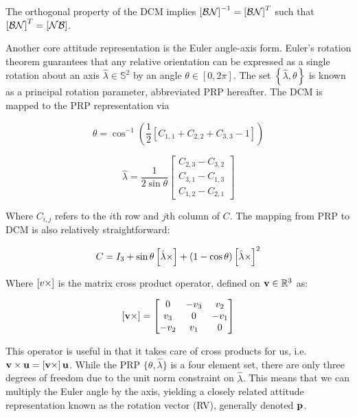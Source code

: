The orthogonal property of the DCM implies $\dcm{bn}^{-1} = \dcm{bn}^T$ such that $\dcm{bn}^T = \dcm{nb}$. 

Another core attitude representation is the Euler angle-axis form. Euler's rotation theorem guarantees that any relative orientation can be expressed as a single rotation about an axis $\hat{\lambda} \in \mathbb{S}^2$ by an angle $\theta \in [0, 2\pi]$. The set $\left\{\hat{\lambda},\theta\right\}$ is known as a principal rotation parameter, abbreviated PRP hereafter. The DCM is mapped to the PRP representation via \cite{shuster1993}

\begin{equation}
    \theta = \cos^{-1}\left(\frac{1}{2} \left[C_{1,1} + C_{2,2} + C_{3,3} - 1 \right] \right)
\end{equation}

\begin{equation}
    \hat{\lambda} = \frac{1}{2\sin{\theta}} 
    \begin{bmatrix} C_{2,3} - C_{3,2} \\ C_{3,1}-C_{1,3} \\ C_{1,2} - C_{2,1}\end{bmatrix}
\end{equation}

Where $C_{i,j}$ refers to the $i$th row and $j$th column of $C$. The mapping from PRP to DCM is also relatively straightforward:

\begin{equation} \labelAndRemember{eq:prp2dcm}
    {C = I_3 + \sin\theta\matcp{\hat{\lambda}} + (1-\cos\theta)\matcp{\hat{\lambda}}^2}
\end{equation}

Where $\left[v \times\right]$ is the matrix cross product operator, defined on $\mathbf{v} \in \mathbb{R}^3$ as:

\begin{equation}
    \left[\mathbf{v} \times\right] = \begin{bmatrix}
        0 & -v_3 & v_2 \\
        v_3 & 0 & -v_1 \\
        -v_2 & v_1 & 0
    \end{bmatrix}
\end{equation}

This operator is useful in that it takes care of cross products for us, i.e. $\mathbf{v} \times \mathbf{u} = \left[\mathbf{v} \times\right]\mathbf{u}$. While the PRP $\{\theta, \hat{\lambda}\}$ is a four element set, there are only three degrees of freedom due to the unit norm constraint on $\hat{\lambda}$. This means that we can multiply the Euler angle by the axis, yielding a closely related attitude representation known as the rotation vector (RV), generally denoted $\mathbf{p}$. 

